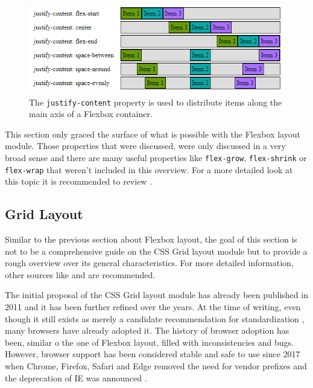 \begin{figure}[tp]
    \centering
    \includegraphics[keepaspectratio,width=\linewidth,height=\fullh / 3]
    {images/flexbox-justify-content.png}

    \caption[Flexbox Justify Content Property]{
        The \lstinline{justify-content} property is used to distribute items along the main axis of a Flexbox container.
    }
    \label{fig:FlexboxJustifyContent}
\end{figure}

This section only graced the surface of what is possible with the Flexbox layout module. Those properties that were discussed, were only discussed in a very broad sense and there are many useful properties like \lstinline{flex-grow}, \lstinline{flex-shrink} or \lstinline{flex-wrap} that weren't included in this overview. For a more detailed look at this topic it is recommended to review \cite{CSSFlexbox}.

\subsection{Grid Layout}
\label{sec:Grid}

Similar to the previous section about Flexbox layout, the goal of this section is not to be a comprehensive guide on the CSS Grid layout module but to provide a rough overview over its general characteristics. For more detailed information, other sources like \cite{GridLayoutInCSS} and \cite{CSSGrid} are recommended.

The initial proposal of the CSS Grid layout module has already been published in 2011 \parencite{CSSGridFirstDraft} and it has been further refined over the years. At the time of writing, even though it still exists as merely a candidate recommendation for standardization \parencite{CSSGrid}, many browsers have already adopted it. The history of browser adoption has been, similar o the one of Flexbox layout, filled with inconsistencies and bugs. However, browser support has been considered stable and safe to use since 2017 when Chrome, Firefox, Safari and Edge removed the need for vendor prefixes and the deprecation of IE was announced \parencite{CanIUseCSSGrid}.

